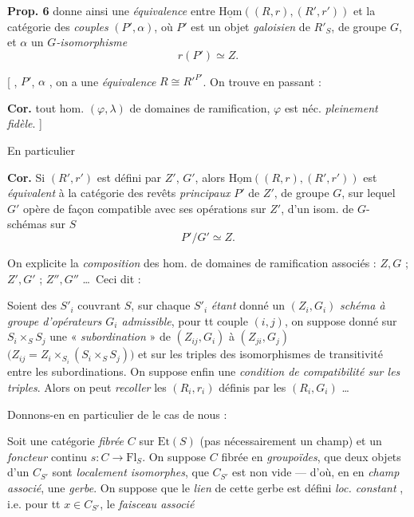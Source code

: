 \documentclass[11pt,a4paper]{article}
\begin{document}
\textbf{Prop. 6}  donne ainsi une \emph{équivalence} entre
$\underline{\mathrm{Hom}}((R, r), (R', r'))$ et la catégorie des \emph{couples}
$(P', \alpha)$, où $P'$ est un objet \emph{galoisien} de $R'_S$, de groupe
$G$, et $\alpha$ un \emph{$G$-isomorphisme}
\[
  r(P') \simeq Z .
\]

[ , $P'$, $\alpha$ , on a une \emph{équivalence}
$R \cong R'^{P'}$. On trouve en passant \struck{\ill{}} :

\textbf{Cor.}  tout hom. $(\varphi, \lambda)$ de domaines
de ramification, \struck{\ill{}} $\varphi$ est néc. \emph{pleinement fidèle}. ]

En particulier

\textbf{Cor.}  Si $(R', r')$ est défini par $Z'$, $G'$, alors
$\underline{\mathrm{Hom}}((R, r), (R', r'))$ est \emph{équivalent} à la
catégorie des revêts \emph{principaux} $P'$ de $Z'$, de groupe
$G$, sur lequel $G'$ opère de façon compatible avec ses opérations sur $Z'$,
\struck{\ill{}}  d'un isom. de $G$-schémas sur $S$
\[
  P'/G' \simeq Z .
\]


On explicite  la \emph{composition} des hom. de domaines de
ramification associés : $Z, G$ ; $Z', G'$ ; $Z'', G''$ \ldots\ Ceci dit :

Soient des $S'_i$ couvrant $S$, sur chaque $S'_i$ \emph{étant} donné un
$(Z_i, G_i)$ \emph{schéma à groupe d'opérateurs $G_i$ admissible}, pour tt
couple $(i,j)$, on suppose donné \struck{\ill{}} sur $S_i \times_S S_j$ une
« \emph{subordination} » de $(Z_{ij}, G_i)$ à $(Z_{ji}, G_j)$
$\bigl(Z_{ij} = Z_i \times_{S_i} (S_i \times_S S_j)\bigr)$ et
\struck{\ill{}} sur les triples \ill{} des isomorphismes de transitivité entre
les subordinations. On suppose enfin une \emph{condition de compatibilité sur
les triples}. Alors on peut \emph{recoller} les $(R_i, r_i)$ définis par les
$(R_i, G_i)$ \ldots

Donnons-en en particulier \ill{} \ill{} de \ill{} le cas de nous :

Soit une catégorie \emph{fibrée}  $C$ sur
$\mathrm{Et}(S)$ (pas nécessairement un champ) et un \emph{foncteur} continu
$s : C \longrightarrow \mathrm{Fl}_S$. On suppose $C$ fibrée en
\emph{groupoïdes}, que deux objets d'un $C_{S'}$ sont \emph{localement
isomorphes}, que $C_{S'}$ est  non vide --- d'où, en \ill{}
\ill{} en \emph{champ associé}, une \emph{gerbe}. On suppose que le
\emph{lien} de cette gerbe est défini \struck{\ill{}} \emph{loc. constant}
\ill{}, i.e. pour tt $x \in C_{S'}$, le \emph{faisceau associé}
\end{document}
